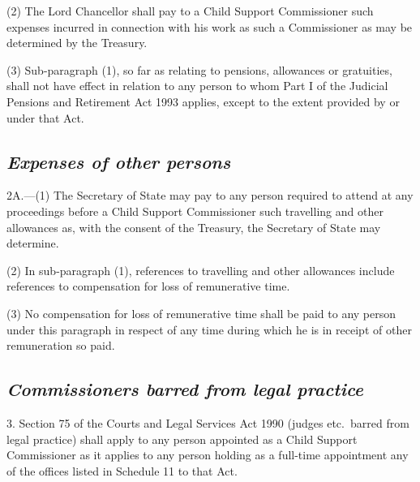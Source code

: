 \documentclass[12pt,a4paper]{article}
\begin{document}
(2) The Lord Chancellor shall pay to a Child Support Commissioner such expenses incurred in connection with his work as such a Commissioner as may be determined by the Treasury.

(3) Sub-paragraph (1), so far as relating to pensions, allowances or gratuities, shall not have effect in relation to any person to whom Part I of the Judicial Pensions and Retirement Act 1993 applies, except to the extent provided by or under that Act.


\subsection*{\itshape Expenses of other persons}

2A.---(1) The Secretary of State may pay to any person required to attend at any proceedings before a Child Support Commissioner such travelling and other allowances as, with the consent of the Treasury, the Secretary of State may determine.


(2) In sub-paragraph (1), references to travelling and other allowances include references to compensation for loss of remunerative time.

(3) No compensation for loss of remunerative time shall be paid to any person under this paragraph in respect of any time during which he is in receipt of other remuneration so paid.


\subsection*{\itshape Commissioners barred from legal practice}

3. Section 75 of the Courts and Legal Services Act 1990 (judges etc.\ barred from legal practice) shall apply to any person appointed as a Child Support Commissioner as it applies to any person holding as a full-time appointment any of the offices listed in Schedule 11 to that Act.
\end{document}
